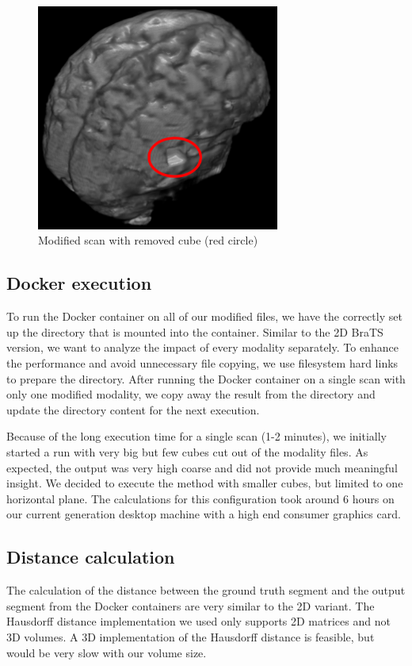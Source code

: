 \begin{figure}[H]
\centering
\includegraphics[width=8cm]{chapters/07_brats3d/images/brain-hdm-marked.png}
\caption{Modified scan with removed cube (red circle)}
\label{brats3d_example}
\end{figure}

\subsection{Docker execution}
To run the Docker container on all of our modified files, we have the correctly set up the directory that is mounted into the container. Similar to the 2D BraTS version, we want to analyze the impact of every modality separately. To enhance the performance and avoid unnecessary file copying, we use filesystem hard links to prepare the directory. After running the Docker container on a single scan with only one modified modality, we copy away the result from the directory and update the directory content for the next execution.

Because of the long execution time for a single scan (1-2 minutes), we initially started a run with very big but few cubes cut out of the modality files. As expected, the output was very high coarse and did not provide much meaningful insight. We decided to execute the method with smaller cubes, but limited to one horizontal plane. The calculations for this configuration took around 6 hours on our current generation desktop machine with a high end consumer graphics card.

\subsection{Distance calculation}
The calculation of the distance between the ground truth segment and the output segment from the Docker containers are very similar to the 2D variant. The Hausdorff distance implementation we used only supports 2D matrices and not 3D volumes. A 3D implementation of the Hausdorff distance is feasible, but would be very slow with our volume size. 

